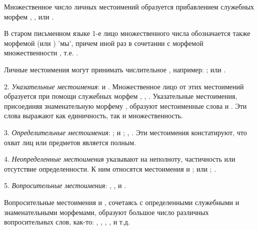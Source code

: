 Множественное число личных местоимений образуется прибавлением служебных морфем , ,  или .

В старом письменном языке 1-е лицо множественного числа обозначается также морфемой	 (или ) 'мы', причем иной раз в сочетании с морфемой множественности , т.е.	.

Личные местоимения могут принимать числительное , например:
;
 или .

2. \emph{Указательные местоимения}:	 и . Множественное лицо от этих местоимений образуется при помощи служебных морфем , , . Указательные местоимения, присоединяя знаменательную морфему , образуют местоименные слова  и . Эти слова выражают как единичность, так и множественность.

3. \emph{Определительные местоимения}: ;  и ; , . Эти местоимения констатируют, что охват лиц или предметов является полным.

4. \emph{Неопределенные местоимения} указывают на неполноту, частичность или отсутствие определенности. К ним относятся местоимения  и ;  или ; .

5. \emph{Вопросительные местоимения}:
, ,  и .

Вопросительные местоимения  и , сочетаясь с определенными служебными и знаменательными морфемами, образуют большое число различных вопросительных слов, как-то:
,
,
,
,
 и т.д.

